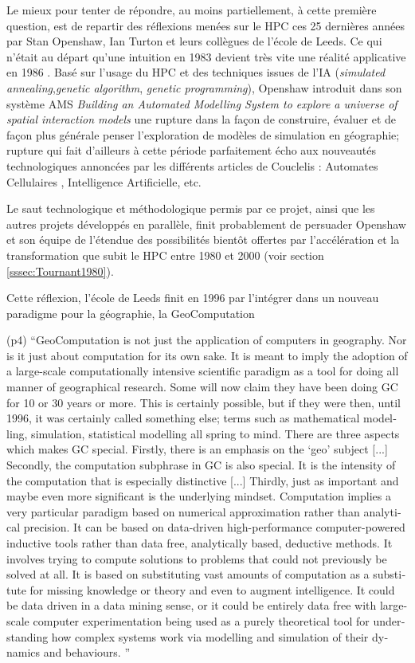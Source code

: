 Le mieux pour tenter de répondre, au moins partiellement, à cette première question, est de repartir des réflexions menées sur le HPC ces 25 dernières années par Stan Openshaw, Ian Turton et leurs collègues de l'école de Leeds. Ce qui n'était au départ qu'une intuition en 1983  devient très vite une réalité applicative en 1986 \autocite{Openshaw1988}. Basé sur l'usage du HPC et des techniques issues de l'IA (\textit{simulated annealing},\textit{genetic algorithm}, \textit{genetic programming}), Openshaw introduit dans son système AMS \textit{Building an Automated Modelling System to explore a universe of spatial interaction models} une rupture dans la façon de construire, évaluer et de façon plus générale penser l'exploration de modèles de simulation en géographie; rupture qui fait d'ailleurs à cette période parfaitement écho aux nouveautés technologiques annoncées par les différents articles de Couclelis : Automates Cellulaires \autocite{Couclelis1985}, Intelligence Artificielle, etc. \autocite{Couclelis1986}

Le saut technologique et méthodologique permis par ce projet, ainsi que les autres projets développés en parallèle, finit probablement de persuader Openshaw et son équipe de l'étendue des possibilités bientôt offertes par l'accélération et la transformation que subit le HPC entre 1980 et 2000 (voir section \ref{sssec:Tournant1980}).

Cette réflexion, l'école de Leeds finit en 1996 par l'intégrer dans un nouveau paradigme pour la géographie, la GeoComputation \autocite{Openshaw2000b}

(p4) \foreignquote{english}{GeoComputation is not just the application of computers in geography. Nor is it just about computation for its own sake. It is meant to imply the adoption of a large-scale computationally intensive scientific paradigm as a tool for doing all manner of geographical research. Some will now claim they have been doing GC for 10 or 30 years or more. This is certainly possible, but if they were then, until 1996, it was certainly called something else; terms such as mathematical modelling, simulation, statistical modelling all spring to mind. There are three aspects which makes GC special. Firstly, there is an emphasis on the ‘geo’ subject [...] Secondly, the computation subphrase in GC is also special. It is the intensity of the computation that is especially distinctive [...] Thirdly, just as important and maybe even more significant is the underlying mindset. Computation implies a very particular paradigm based on numerical approximation rather than analytical precision. It can be based on data-driven high-performance computer-powered inductive tools rather than data free, analytically based, deductive methods. It involves trying to compute solutions to problems that could not previously be solved at all. It is based on substituting vast amounts of  computation as a substitute for missing knowledge or theory and even to augment intelligence. It could be data driven in a data mining sense, or it could be entirely data free with large-scale computer experimentation being used as a purely theoretical tool for understanding how complex systems work via modelling and simulation of their dynamics and behaviours. }

